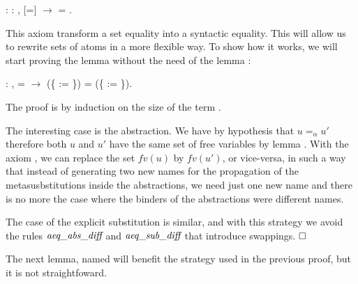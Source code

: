 \begin{coqdoccode}
\coqdocemptyline
\coqdocnoindent
{} : \coqdockw{\ensuremath{\forall}}  : ,  [=]  \ensuremath{\rightarrow}  = .\coqdoceol
\coqdocemptyline
\end{coqdoccode}
This axiom transform a set equality into a syntactic equality. This will allow us to rewrite sets of atoms in a more flexible way. To show how it works, we will start proving the lemma  without the need of the lemma :
\begin{coqdoccode}
\coqdocemptyline
\coqdocnoindent
{} : \coqdockw{\ensuremath{\forall}}    ,  =  \ensuremath{\rightarrow} (\{ := \}) = (\{ := \}).\coqdoceol
\end{coqdoccode}
 The proof is by induction on the size of the term .
\begin{coqdoccode}
\end{coqdoccode}
The interesting case is the abstraction. We have by hypothesis that $u =_\alpha u'$ therefore both $u$ and $u'$ have the same set of free variables by lemma . With the axiom , we can replace the set $fv(u)$ by $fv(u')$, or vice-versa, in such a way that instead of generating two new names for the propagation of the metasusbstitutions inside the abstractions, we need just one new name and there is no more the case where the binders of the abstractions were different names. 
\begin{coqdoccode}
\end{coqdoccode}
The case of the explicit substitution is similar, and with this strategy we avoid the rules $\mbox{\it aeq}\_\mbox{\it abs}\_\mbox{\it diff}$ and $\mbox{\it aeq}\_\mbox{\it sub}\_\mbox{\it diff}$ that introduce swappings. $\hfill\Box$
\begin{coqdoccode}
\end{coqdoccode}
\newline 
\begin{coqdoccode}
\coqdocemptyline
\coqdocemptyline
\end{coqdoccode}
The next lemma, named  will benefit the strategy used in the previous proof, but it is not straightfoward.
